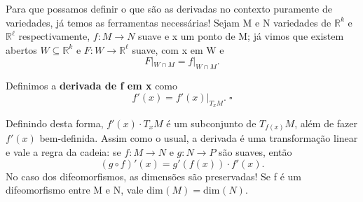 \documentclass[../differential_topology.tex]{subfiles}
\begin{document}
Para que possamos definir o que são as derivadas no contexto puramente de variedades, já temos as ferramentas necessárias! Sejam M e N variedades de \(\mathbb{R}^{k}\) e \(\mathbb{R}^{\ell }\) respectivamente, \(f:M\rightarrow N\) suave e x um ponto de M; já vimos que existem abertos \(W\subseteq \mathbb{R}^{k}\) e \(F:W\rightarrow \mathbb{R}^{\ell }\) suave, com x em W e
\[
	F|_{W\cap M}=f|_{W\cap M}.
\]
\begin{def*}
	Definimos a \textbf{derivada de f em x} como
	\[
		f'(x) = f'(x)|_{T_{x}M}.\; \square
	\]
\end{def*}
Definindo desta forma, \(f'(x)\cdot T_{x}M\) é um subconjunto de \(T_{f(x)}M\), além de fazer \(f'(x)\) bem-definida.
Assim como o usual, a derivada é uma transformação linear e vale a regra da cadeia: se \(f:M\rightarrow N\) e \(g:N\rightarrow P\) são suaves, então
\[
	(g\circ f)'(x)=g'(f(x))\cdot f'(x).
\]
No caso dos difeomorfismos, as dimensões são preservadas! Se f é um difeomorfismo entre M e N, vale \(\mathrm{dim}_{}(M) = \mathrm{dim}_{}(N)\).
\end{document}
